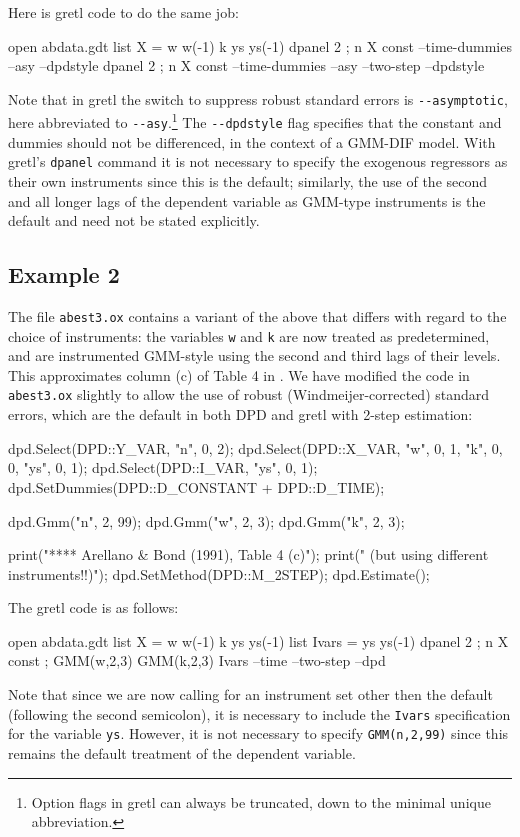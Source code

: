 Here is gretl code to do the same job:

\begin{code}
open abdata.gdt
list X = w w(-1) k ys ys(-1)
dpanel 2 ; n X const --time-dummies --asy --dpdstyle
dpanel 2 ; n X const --time-dummies --asy --two-step --dpdstyle
\end{code}

Note that in gretl the switch to suppress robust standard errors is
\verb|--asymptotic|, here abbreviated to \verb|--asy|.\footnote{Option
  flags in gretl can always be truncated, down to the minimal unique
  abbreviation.} The \verb|--dpdstyle| flag specifies that the
constant and dummies should not be differenced, in the context of a
GMM-DIF model. With gretl's \texttt{dpanel} command it is not
necessary to specify the exogenous regressors as their own instruments
since this is the default; similarly, the use of the second and all
longer lags of the dependent variable as GMM-type instruments is the
default and need not be stated explicitly. 

\subsection{Example 2}

The  file \texttt{abest3.ox} contains a variant of the above
that differs with regard to the choice of instruments: the variables
\texttt{w} and \texttt{k} are now treated as predetermined, and are
instrumented GMM-style using the second and third lags of their
levels. This approximates column (c) of Table 4 in
\cite{arellano-bond91}.  We have modified the code in
\texttt{abest3.ox} slightly to allow the use of robust
(Windmeijer-corrected) standard errors, which are the default in both
DPD and gretl with 2-step estimation:

\begin{code}
dpd.Select(DPD::Y_VAR, {"n", 0, 2});
dpd.Select(DPD::X_VAR, {"w", 0, 1, "k", 0, 0, "ys", 0, 1});
dpd.Select(DPD::I_VAR, {"ys", 0, 1});
dpd.SetDummies(DPD::D_CONSTANT + DPD::D_TIME);

dpd.Gmm("n", 2, 99);
dpd.Gmm("w", 2, 3);
dpd.Gmm("k", 2, 3);

print("\n***** Arellano & Bond (1991), Table 4 (c)\n");
print("        (but using different instruments!!)\n");
dpd.SetMethod(DPD::M_2STEP);
dpd.Estimate();
\end{code}

The gretl code is as follows:

\begin{code}
open abdata.gdt
list X = w w(-1) k ys ys(-1)
list Ivars = ys ys(-1)
dpanel 2 ; n X const ; GMM(w,2,3) GMM(k,2,3) Ivars --time --two-step --dpd
\end{code}
%
Note that since we are now calling for an instrument set other then
the default (following the second semicolon), it is necessary to
include the \texttt{Ivars} specification for the variable \texttt{ys}.
However, it is not necessary to specify \texttt{GMM(n,2,99)} since
this remains the default treatment of the dependent variable.

